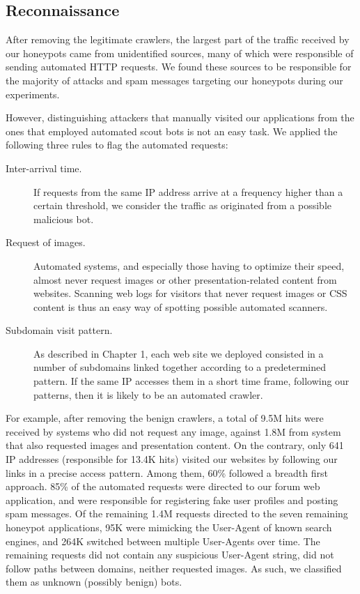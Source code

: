 \subsection{Reconnaissance}

After removing the legitimate crawlers, the largest part of the traffic received by our honeypots came from unidentified sources, many of which were responsible of sending automated HTTP requests. We found these sources to be responsible for the majority of attacks and spam messages targeting our honeypots during our experiments.

However, distinguishing attackers that manually visited our applications from the ones that employed automated scout bots is not an easy task. We applied the following three rules to flag the automated requests:

\begin{description}
\item[Inter-arrival time.] If requests from the same IP address arrive at a frequency higher than a certain threshold, we consider the traffic as originated from a possible malicious bot.
\item[Request of images.] Automated systems, and especially those having to optimize their speed, almost never request images or other presentation-related content from websites. Scanning web logs for visitors that never request images or CSS content is thus an easy way of spotting possible automated scanners.
\item[Subdomain visit pattern.] As described in Chapter 1, each web site we deployed consisted in a number of subdomains linked together according to a predetermined pattern. If the same IP accesses them in a short time frame, following our patterns, then it is likely to be an automated crawler.
\end{description}

For example, after removing the benign crawlers, a total of 9.5M hits were received by systems who did not request any image, against 1.8M from system that also requested images and presentation content. On the contrary, only 641 IP addresses (responsible for 13.4K hits) visited our websites by following our links in a precise access pattern. Among them, 60\% followed a breadth first approach.
85\% of the automated requests were directed to our forum web application, and were responsible for registering fake user profiles and posting spam messages. Of the remaining 1.4M requests directed to the seven remaining honeypot applications, 95K were mimicking the User-Agent of known search engines, and 264K switched between multiple User-Agents over time. The remaining requests did not contain any suspicious User-Agent string, did not follow paths between domains, neither requested images. As such, we classified them as unknown (possibly benign) bots.

